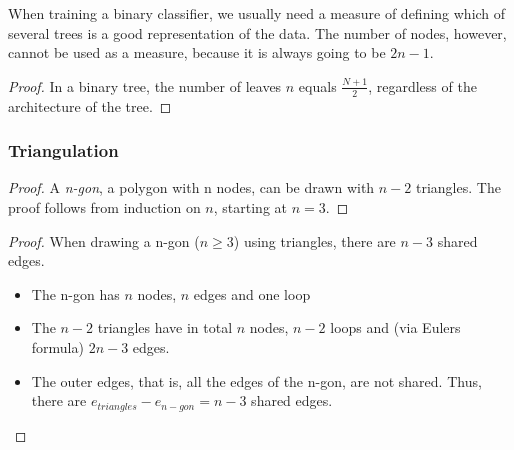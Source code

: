 When training a binary classifier, we usually need a measure of defining which of several trees is a good representation of the data. The number of nodes, however, cannot be used as a measure, because it is always going to be $2n - 1$.
\begin{proof} In a binary tree, the number of leaves $n$ equals $\frac{N+1}{2}$, regardless of the architecture of the tree.


\end{proof}


\subsubsection{Triangulation}

\begin{proof} A \emph{n-gon}, a polygon with n nodes, can be drawn with $n-2$ triangles.
The proof follows from induction on $n$, starting at $n=3$.
\end{proof}

\begin{proof} When drawing a n-gon ($n \geq 3$) using triangles, there are $n-3$ shared edges.
\begin{itemize}
    \item The n-gon has $n$ nodes, $n$ edges and one loop
    \item The $n-2$ triangles have in total $n$ nodes, $n-2$ loops and (via Eulers formula) $2n-3$ edges.
    \item The outer edges, that is, all the edges of the n-gon, are not shared. Thus, there are $e_{triangles} - e_{n-gon} = n-3$ shared edges.
\end{itemize}
\end{proof}



